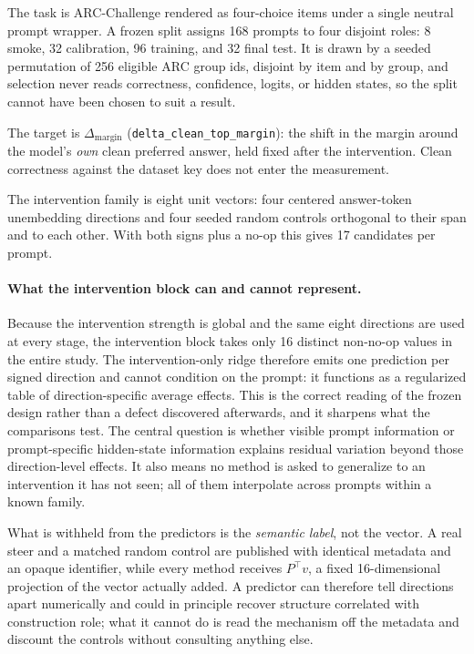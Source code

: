 \documentclass{article}
\begin{document}
The task is ARC-Challenge rendered as four-choice items under a single neutral prompt wrapper. A
frozen split assigns 168 prompts to four disjoint roles: 8 smoke, 32 calibration, 96 training, and
32 final test. It is drawn by a seeded permutation of 256 eligible ARC group ids, disjoint by item
and by group, and selection never reads correctness, confidence, logits, or hidden states, so the
split cannot have been chosen to suit a result.

The target is $\Delta_{\text{margin}}$ (\texttt{delta\_clean\_top\_margin}): the shift in the margin
around the model's \emph{own} clean preferred answer, held fixed after the intervention. Clean
correctness against the dataset key does not enter the measurement.

The intervention family is eight unit vectors: four centered answer-token unembedding directions
and four seeded random controls orthogonal to their span and to each other. With both signs plus a
no-op this gives 17 candidates per prompt.

\paragraph{What the intervention block can and cannot represent.} Because the intervention strength
is global and the same eight directions are used at every stage, the intervention block takes only
16 distinct non-no-op values in the entire study. The intervention-only ridge therefore emits one
prediction per signed direction and cannot condition on the prompt: it functions as a regularized
table of direction-specific average effects. This is the correct reading of the frozen design
rather than a defect discovered afterwards, and it sharpens what the comparisons test. The central
question is whether visible prompt information or prompt-specific hidden-state information explains
residual variation beyond those direction-level effects. It also means no method is asked to
generalize to an intervention it has not seen; all of them interpolate across prompts within a known
family.

What is withheld from the predictors is the \emph{semantic label}, not the vector. A real steer
and a matched random control are published with identical metadata and an opaque identifier, while
every method receives $P^{\top} v$, a fixed 16-dimensional projection of the vector actually added.
A predictor can therefore tell directions apart numerically and could in principle recover structure
correlated with construction role; what it cannot do is read the mechanism off the metadata and
discount the controls without consulting anything else.
\end{document}
